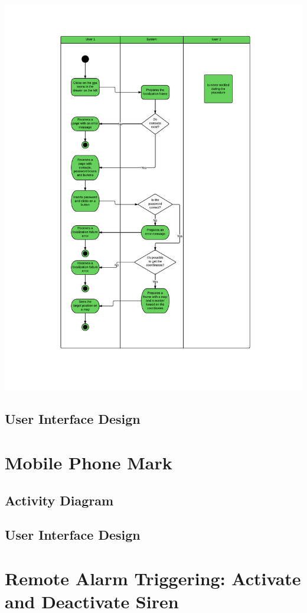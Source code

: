 \includegraphics[scale=0.7]{images/Localization}

\newpage
\subsection{User Interface Design}

\section{Mobile Phone Mark}

\newpage
\subsection{Activity Diagram}

\newpage
\subsection{User Interface Design}

\section{Remote Alarm Triggering: Activate and Deactivate Siren}

